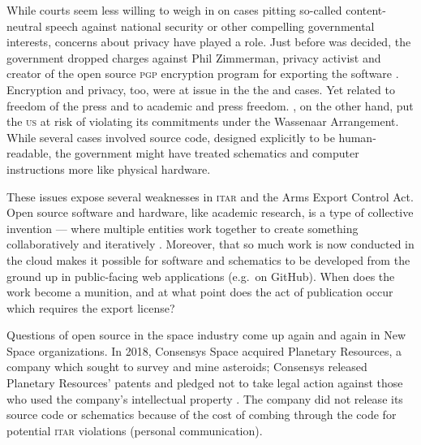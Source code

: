 \documentclass[12pt]{olfmemo}
\begin{document}
While courts seem less willing to weigh in on cases pitting so-called content-neutral speech against national security or other compelling governmental interests, concerns about privacy have played a role. Just before  was decided, the government dropped charges against Phil Zimmerman, privacy activist and creator of the open source \textsc{pgp} encryption program for exporting the software \citep{Markoff1996}. Encryption and privacy, too, were at issue in the the  and  cases. Yet  related to freedom of the press and  to academic and press freedom. , on the other hand, put the \textsc{us} at risk of violating its commitments under the Wassenaar Arrangement. While several cases involved source code, designed explicitly to be human-readable, the government might have treated schematics and computer instructions more like physical hardware.

These issues expose several weaknesses in \textsc{itar} and the Arms Export Control Act. Open source software and hardware, like academic research, is a type of collective invention --- where multiple entities work together to create something collaboratively and iteratively \citep{Allen1983,Schrape2019}. Moreover, that so much work is now conducted in the cloud makes it possible for software and schematics to be developed from the ground up in public-facing web applications (e.g.\ on GitHub). When does the work become a munition, and at what point does the act of publication occur which requires the export license?

Questions of open source in the space industry come up again and again in New Space organizations. In 2018, Consensys Space acquired Planetary Resources, a company which sought to survey and mine asteroids; Consensys released Planetary Resources' patents and pledged not to take legal action against those who used the company's intellectual property \citep{Consensys2018}. The company did not release its source code or schematics because of the cost of combing through the code for potential \textsc{itar} violations (personal communication).
\end{document}

